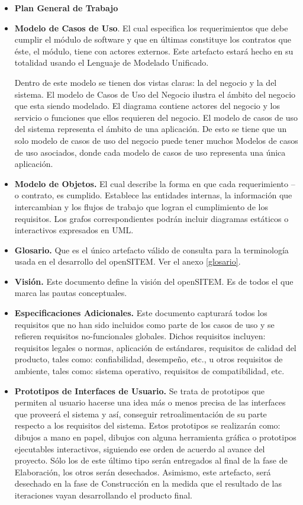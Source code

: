 \begin{itemize}
\item \textbf{Plan General de Trabajo}
\item \textbf{Modelo de Casos de Uso}. El cual especifica los requerimientos que debe cumplir el módulo de software y que en últimas constituye los contratos que éste, el módulo, tiene con actores externos. Este artefacto estará hecho en su totalidad usando el Lenguaje de Modelado Unificado. 

Dentro de este modelo se tienen dos vistas claras: la del negocio y la del sistema. El modelo de Casos de Uso del Negocio ilustra el ámbito del negocio que esta siendo modelado. El diagrama contiene actores del negocio y los servicio o funciones que ellos requieren del negocio. El modelo de casos de uso del sistema representa el ámbito de una aplicación. De esto se tiene que un solo modelo de casos de uso del negocio puede tener muchos Modelos de casos de uso asociados, donde cada modelo de casos de uso representa una única aplicación.

\item \textbf{Modelo de Objetos.} El cual describe la forma en que cada requerimiento – o contrato,  es cumplido. Establece las entidades internas, la información que intercambian y los flujos de trabajo que logran el cumplimiento de los requisitos. Los grafos correspondientes podrán incluir diagramas estáticos o interactivos expresados en UML.

\item \textbf{Glosario.} Que es el único artefacto válido de consulta para la terminología usada en el desarrollo del openSITEM. Ver el anexo \ref{glosario}.

\item \textbf{Visión.} Este documento define la visión del openSITEM. Es de todos el que marca las pautas conceptuales. 

\item \textbf{Especificaciones Adicionales.} Este documento capturará todos los requisitos que no han sido incluidos como parte de los casos de uso y se refieren requisitos no-funcionales globales. Dichos requisitos incluyen: requisitos legales o normas, aplicación de estándares, requisitos de calidad del producto, tales como: confiabilidad, desempeño, etc., u otros requisitos de ambiente, tales como: sistema operativo, requisitos de compatibilidad, etc. 

\item \textbf{Prototipos de Interfaces de Usuario.} Se trata de prototipos que permiten al usuario hacerse una idea más o menos precisa de las interfaces que proveerá el sistema y así, conseguir retroalimentación de su parte respecto a los requisitos del sistema. Estos prototipos se realizarán como: dibujos a mano en papel, dibujos con alguna herramienta gráfica o prototipos ejecutables interactivos, siguiendo ese orden de acuerdo al avance del proyecto. Sólo los de este último tipo serán entregados al final de la fase de Elaboración, los otros serán desechados. Asimismo, este artefacto, será desechado en la fase de Construcción en la medida que el resultado de las iteraciones vayan desarrollando el producto final. 


\end{itemize}
